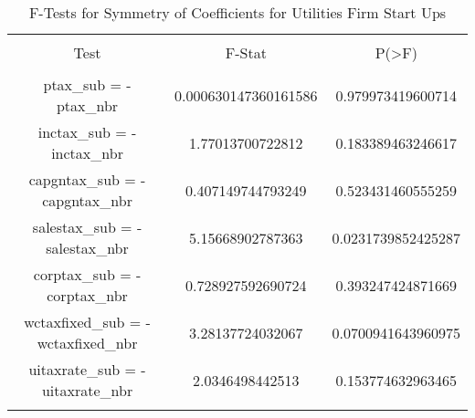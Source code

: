 
\begin{table}[!htbp] \centering 
  \caption{F-Tests for Symmetry of Coefficients for Utilities Firm Start Ups} 
  \label{} 
\begin{tabular}{@{\extracolsep{5pt}} ccc} 
\\[-1.8ex]\hline 
\hline \\[-1.8ex] 
Test & F-Stat & P(\textgreater F) \\ 
\hline \\[-1.8ex] 
ptax\_sub = -ptax\_nbr & 0.000630147360161586 & 0.979973419600714 \\ 
inctax\_sub = -inctax\_nbr & 1.77013700722812 & 0.183389463246617 \\ 
capgntax\_sub = -capgntax\_nbr & 0.407149744793249 & 0.523431460555259 \\ 
salestax\_sub = -salestax\_nbr & 5.15668902787363 & 0.0231739852425287 \\ 
corptax\_sub = -corptax\_nbr & 0.728927592690724 & 0.393247424871669 \\ 
wctaxfixed\_sub = -wctaxfixed\_nbr & 3.28137724032067 & 0.0700941643960975 \\ 
uitaxrate\_sub = -uitaxrate\_nbr & 2.0346498442513 & 0.153774632963465 \\ 
\hline \\[-1.8ex] 
\end{tabular} 
\end{table} 

